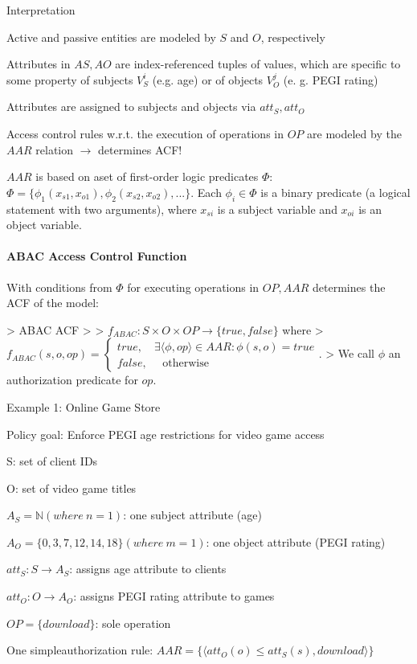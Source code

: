 \documentclass[a4paper]{article}
\begin{document}
\begin{multicols}{3}
    Interpretation
    \begin{itemize*}
        \item Active and passive entities are modeled by $S$ and $O$, respectively
        \item Attributes in $AS,AO$ are index-referenced tuples of values, which are specific to some property of subjects $V_S^i$ (e.g. age) or of objects $V_O^j$ (e. g. PEGI rating)
        \item Attributes are assigned to subjects and objects via $att_S,att_O$
        \item Access control rules w.r.t. the execution of operations in $OP$ are modeled by the $AAR$ relation $\rightarrow$ determines ACF!
        \item $AAR$ is based on aset of first-order logic predicates $\Phi$: $\Phi=\{\phi_1 (x_{s1},x_{o1}),\phi_2 (x_{s2},x_{o2}),...\}$. Each $\phi_i\in\Phi$ is a binary predicate (a logical statement with two arguments), where $x_{si}$ is a subject variable and $x_{oi}$ is an object variable.
    \end{itemize*}


    \paragraph{ABAC Access Control Function}
    With conditions from $\Phi$ for executing operations in $OP,AAR$ determines the ACF of the model:

    > ABAC ACF
    >
    > $f_{ABAC}:S\times O\times OP\rightarrow\{true,false\}$ where
    > $f_{ABAC}(s,o,op)= \begin{cases} true, \quad\exists ⟨\phi,op⟩\in AAR:\phi(s,o)=true\\ false, \quad\text{ otherwise } \end{cases}$.
    > We call $\phi$ an authorization predicate for $op$.

    Example 1: Online Game Store
    \begin{itemize*}
        \item Policy goal: Enforce PEGI age restrictions for video game access
        \item S: set of client IDs
        \item O: set of video game titles
        \item $A_S=\mathbb{N}(where\ n=1)$: one subject attribute (age)
        \item $A_O=\{0,3,7,12,14,18\}(where\ m=1)$: one object attribute (PEGI rating)
        \item $att_S:S\rightarrow A_S$: assigns age attribute to clients
        \item $att_O:O\rightarrow A_O$: assigns PEGI rating attribute to games
        \item $OP=\{download\}$: sole operation
        \item One simpleauthorization rule: $AAR=\{⟨att_O(o) \leq att_S(s),download⟩\}$
    \end{itemize*}


\end{multicols}
\end{document}
